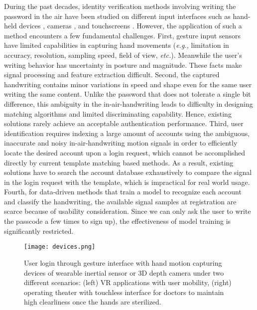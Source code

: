 \documentclass[conference]{IEEEtran}
\begin{document}
During the past decades, identity verification methods involving writing the password in the air have been studied on different input interfaces such as hand-held devices \cite{Madrid-Analysis, uWave, Greece}, cameras \cite{VSig, LeapHand, LeapPassword, KinWrite}, and touchscreens \cite{frank2013touchalytics, gong2016forgery, yang2016free}. However, the application of such a method encounters a few fundamental challenges. First, gesture input sensors have limited capabilities in capturing hand movements (\textit{e.g.,} limitation in accuracy, resolution, sampling speed, field of view, \textit{etc.}). Meanwhile the user's writing behavior has uncertainty in posture and magnitude. These facts make signal processing and feature extraction difficult. Second, the captured handwriting contains minor variations in speed and shape even for the same user writing the same content. Unlike the password that does not tolerate a single bit difference, this ambiguity in the in-air-handwriting leads to difficulty in designing matching algorithms and limited discriminating capability. Hence, existing solutions rarely achieve an acceptable authentication performance. Third, user identification requires indexing a large amount of accounts using the ambiguous, inaccurate and noisy in-air-handwriting motion signals in order to efficiently locate the desired account upon a login request, which cannot be accomplished directly by current template matching based methods. As a result, existing solutions have to search the account database exhaustively to compare the signal in the login request with the template, which is impractical for real world usage. Fourth, for data-driven methods that train a model to recognize each account and classify the handwriting, the available signal samples at registration are scarce because of usability consideration. Since we can only ask the user to write the passcode a few times to sign up), the effectiveness of model training is significantly restricted.


\begin{figure*}[!t]
\centering
\texttt{[image: devices.png]}
\caption{User login through gesture interface with hand motion capturing devices of wearable inertial sensor or 3D depth camera under two different scenarios: (left) VR applications with user mobility, (right) operating theater with touchless interface for doctors to maintain high clearliness once the hands are sterilized.}
\label{fig:devices}
\end{figure*}
\end{document}
